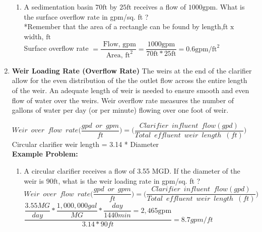 \begin{enumerate}
\begin{enumerate}[1.]
\item A sedimentation basin $70 \mathrm{ft}$ by $25 \mathrm{ft}$ receives a flow of $1000 \mathrm{gpm}$. What is the surface overflow rate in gpm/sq. ft ?\\
\vspace{0.2cm}
*Remember that the area of a rectangle can be found by length,ft $\mathrm{x}$ width, $\mathrm{ft}$\\
\vspace{0.2cm}
Surface overflow rate $=\dfrac{\text { Flow, } \mathrm{gpm}}{\text { Area, } \mathrm{ft}^{2}}=\dfrac{1000 \mathrm{gpm}}{70 \mathrm{ft} * 25 \mathrm{ft}}=\boxed{0.6 \mathrm{gpm} / \mathrm{ft}^{2}}$\\
\vspace{0.2cm}
\end{enumerate}
%

\item \textbf{Weir Loading Rate (Overflow Rate)}
The weirs at the end of the clarifier allow for the even distribution of the the outlet flow across the entire length of the weir.  An adequate length of weir is needed to ensure smooth and even flow of water over the weirs.  Weir overflow rate measures the number of gallons of water per day (or per minute) flowing over one foot of weir. 

		$Weir \enspace over \enspace flow \enspace rate \Big(\dfrac{gpd \enspace or \enspace gpm}{ft}\Big) =\Big(\dfrac{Clarifier \enspace influent \enspace  flow (gpd)}{Total \enspace effluent 					\enspace weir \enspace length \enspace (ft)}\Big)$
		Circular clarifier weir length = 3.14 * Diameter\\
\textbf{Example Problem:}\\
\begin{enumerate}[1.]
\item  A circular clarifier receives a flow of 3.55 MGD. If the diameter of the weir is $90 \mathrm{ft}$, what is the weir  loading rate in gpm/sq. ft ?\\

		$Weir \enspace over \enspace flow \enspace rate \Big(\dfrac{gpd \enspace or \enspace gpm}{ft}\Big) =\Big(\dfrac{Clarifier \enspace influent \enspace  flow (gpd)}{Total \enspace effluent 					\enspace weir \enspace length \enspace (ft)}\Big)$\\
		\vspace{0.2cm}
		$\dfrac{\dfrac{3.55 MG}{day} * \dfrac{1,000,000 gal}{MG} * \dfrac{day}{1440min}=2,465 \mathrm{gpm}}{3.14 * 90ft}=\boxed{8.7 gpm/ft}$
\end{enumerate}
\end{enumerate}

